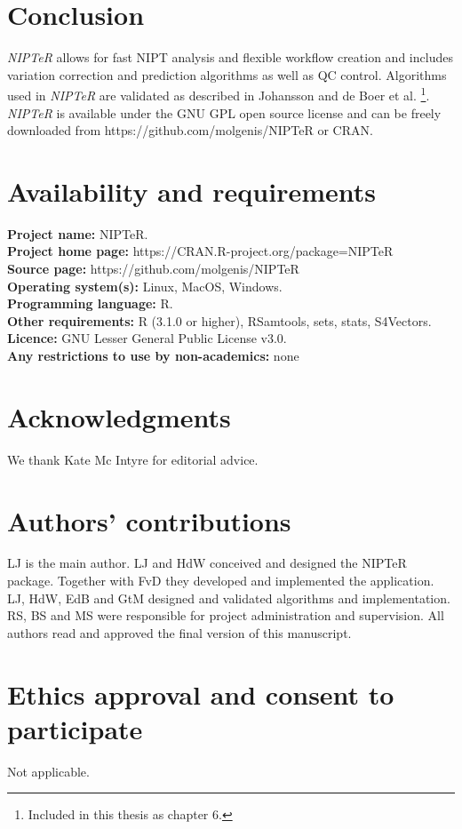 \section{Conclusion}\label{Conclusion}
\textsl{NIPTeR} allows for fast NIPT analysis and flexible workflow creation and includes variation correction and prediction algorithms as well as QC control. 
Algorithms used in \textsl{NIPTeR} are validated as described in Johansson and de Boer et al. \cite{Johansson_2017}\footnote{Included in this thesis as chapter 6.}. 
\textsl{NIPTeR} is available under the GNU GPL open source license and can be freely downloaded from https://github.com/molgenis/NIPTeR or CRAN.

\section{Availability and requirements}
\textbf{Project name:} NIPTeR. \\
\textbf{Project home page:} https://CRAN.R-project.org/package=NIPTeR \\
\textbf{Source page:} https://github.com/molgenis/NIPTeR \\
\textbf{Operating system(s):} Linux, MacOS, Windows. \\
\textbf{Programming language:} R. \\
\textbf{Other requirements:} R (3.1.0 or higher), RSamtools, sets, stats, S4Vectors. \\
\textbf{Licence:} GNU Lesser General Public License v3.0. \\
\textbf{Any restrictions to use by non-academics:} none

\section*{Acknowledgments}\label{Acknowledgments} 
We thank Kate Mc Intyre for editorial advice.

\section*{Authors’ contributions}
LJ is the main author. 
LJ and HdW conceived and designed the NIPTeR package. 
Together with FvD they developed and implemented the application. 
LJ, HdW, EdB and GtM designed and validated algorithms and implementation. 
RS, BS and MS were responsible for project administration and supervision. 
All authors read and approved the final version of this manuscript.

\section*{Ethics approval and consent to participate}
Not applicable.

